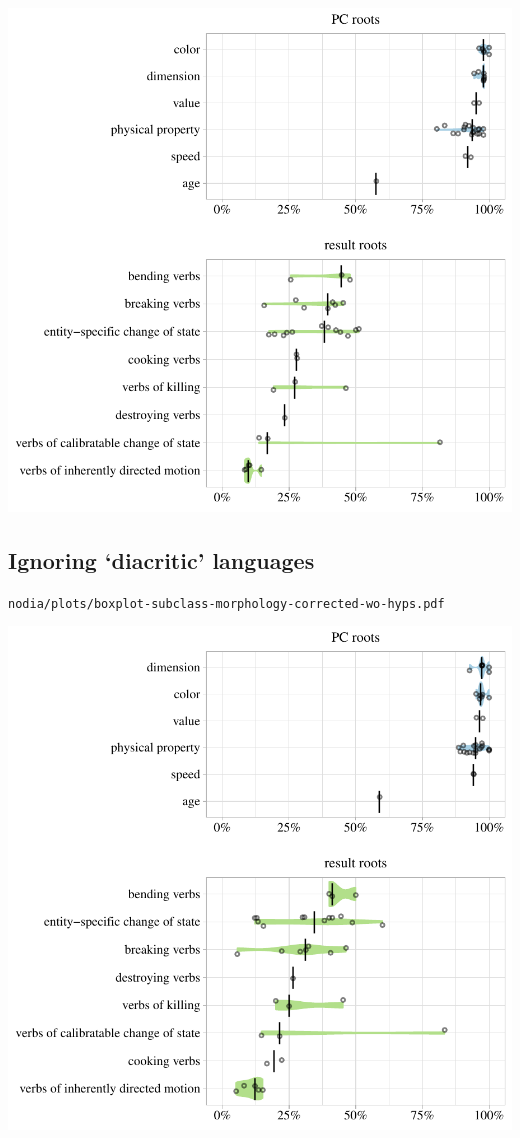 \includegraphics[width=1.0\textwidth]{../nolow/plots/boxplot-subclass-morphology-corrected-wo-hyps.pdf}

\subsection{Ignoring `diacritic' languages}

\texttt{nodia/plots/boxplot-subclass-morphology-corrected-wo-hyps.pdf}

\includegraphics[width=1.0\textwidth]{../nodia/plots/boxplot-subclass-morphology-corrected-wo-hyps.pdf}

